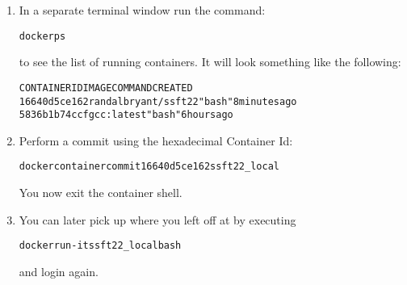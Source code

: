 \documentclass[12pt]{article}
\newenvironment{code}{\begin{alltt}\small}{\end{alltt}}
\begin{document}
\begin{enumerate}
\item In a separate terminal window run the command:
  \begin{code}
docker ps
  \end{code}
  to see the list of running containers.  It will look something like the following:
\begin{code}
CONTAINER ID   IMAGE                 COMMAND   CREATED
16640d5ce162   randalbryant/ssft22   "bash"    8 minutes ago
5836b1b74ccf   gcc:latest            "bash"    6 hours ago 
\end{code}

\item Perform a commit using the hexadecimal Container Id:
\begin{code}
docker container commit 16640d5ce162 ssft22_local
\end{code}
You now exit the container shell.

\item You can later pick up where you left off at by executing
\begin{code}
docker run -it ssft22_local bash
\end{code}
and login again.
\end{enumerate}
\end{document}
